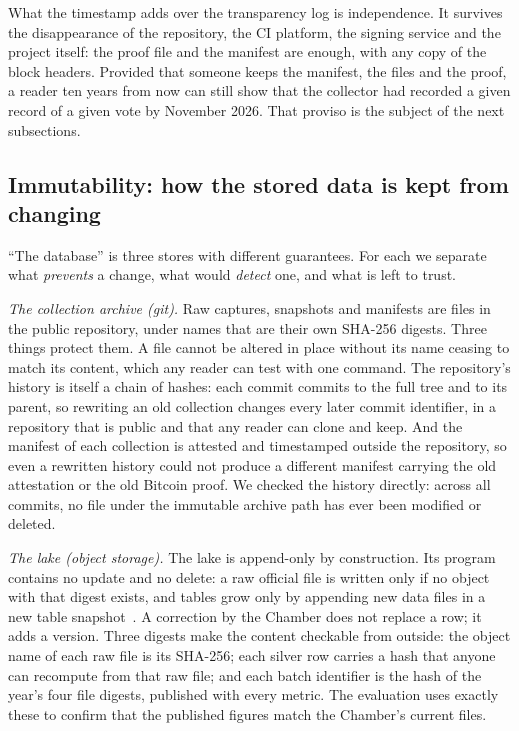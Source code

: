 What the timestamp adds over the transparency log is independence. It survives the disappearance of the repository, the CI platform, the signing service and the project itself: the proof file and the manifest are enough, with any copy of the block headers. Provided that someone keeps the manifest, the files and the proof, a reader ten years from now can still show that the collector had recorded a given record of a given vote by November 2026. That proviso is the subject of the next subsections.

\subsection{Immutability: how the stored data is kept from changing}
\label{sec:immutability}

``The database'' is three stores with different guarantees. For each we separate what \emph{prevents} a change, what would \emph{detect} one, and what is left to trust.

\emph{The collection archive (git).} Raw captures, snapshots and manifests are files in the public repository, under names that are their own SHA-256 digests. Three things protect them. A file cannot be altered in place without its name ceasing to match its content, which any reader can test with one command. The repository's history is itself a chain of hashes: each commit commits to the full tree and to its parent, so rewriting an old collection changes every later commit identifier, in a repository that is public and that any reader can clone and keep. And the manifest of each collection is attested and timestamped outside the repository, so even a rewritten history could not produce a different manifest carrying the old attestation or the old Bitcoin proof. We checked the history directly: across all commits, no file under the immutable archive path has ever been modified or deleted.

\emph{The lake (object storage).} The lake is append-only by construction. Its program contains no update and no delete: a raw official file is written only if no object with that digest exists, and tables grow only by appending new data files in a new table snapshot~\citep{iceberg-spec}. A correction by the Chamber does not replace a row; it adds a version. Three digests make the content checkable from outside: the object name of each raw file is its SHA-256; each silver row carries a hash that anyone can recompute from that raw file; and each batch identifier is the hash of the year's four file digests, published with every metric. The evaluation uses exactly these to confirm that the published figures match the Chamber's current files.

